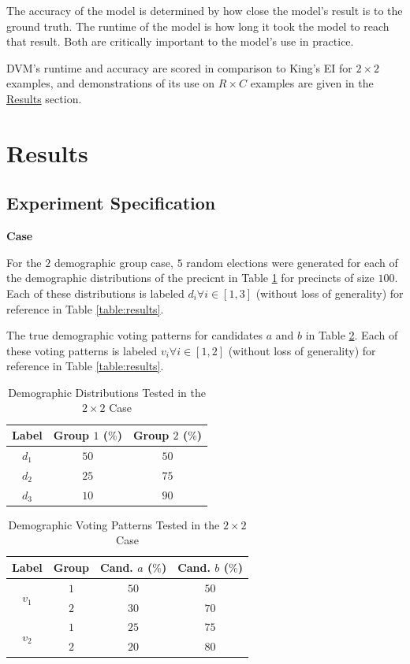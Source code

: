 \documentclass[fleqn,10pt]{style}
\begin{document}
The accuracy of the model is determined by how close the model's result is to the ground truth. The runtime of the model is how long it took the model to reach that result. Both are critically important to the model's use in practice.

DVM's runtime and accuracy are scored in comparison to King's EI for $2 \times 2$ examples, and demonstrations of its use on $R \times C$ examples are given in the \hyperref[sec:results]{Results} section.


\newpage
\section{Results}
\label{sec:results}

\subsection{Experiment Specification}

 \textbf{Case}

For the $2$ demographic group case, $5$ random elections were generated for each of the demographic distributions of the precicnt in Table \ref{table:demo_dist} for precincts of size $100$. Each of these distributions is labeled $d_i \forall i \in [1, 3]$ (without loss of generality) for reference in Table \ref{table:results}.

The true demographic voting patterns for candidates $a$ and $b$ in Table \ref{table:voting}. Each of these voting patterns is labeled $v_i \forall i \in [1, 2]$ (without loss of generality) for reference in Table \ref{table:results}.

\begin{table}[ht]
 \centering
 \caption{Demographic Distributions Tested in the $2 \times 2$ Case}
 \label{table:demo_dist}
 \begin{tabular}{|c|c|c|}
   \hline
   Label & Group $1$ ($\%$) & Group $2$ ($\%$) \\
   \hline
   $d_1$ & $50$ & $50$ \\
   $d_2$ & $25$ & $75$ \\
   $d_3$ & $10$ & $90$ \\
  \hline
 \end{tabular}
\end{table}

\begin{table}[ht]
 \centering
 \caption{Demographic Voting Patterns Tested in the $2 \times 2$ Case}
 \label{table:voting}
 \begin{tabular}{|c|c|c|c|}
   \hline
   Label & Group & Cand. $a$ ($\%$) & Cand. $b$ ($\%$) \\
   \hline
   \multirow{2}{*}{$v_1$} & $1$ & $50$ & $50$ \\
   & $2$ & $30$ & $70$ \\
   \hline
   \multirow{2}{*}{$v_2$} & $1$ & $25$ & $75$ \\
   & $2$ & $20$ & $80$ \\
  \hline
 \end{tabular}
\end{table}
\end{document}
